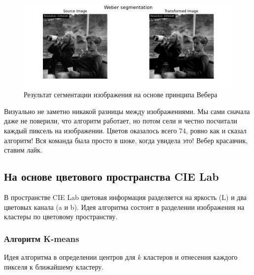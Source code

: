 \begin{figure}[ht!]
    \centering
    \includegraphics[width=\textwidth]{../results/Weber segmentation.png}
    \caption{Результат сегментации изображения на основе принципа Вебера}
    \label{img:weber_segmentation}
\end{figure}

Визуально не заметно никакой разницы между изображениями. Мы сами сначала даже не поверили, 
что алгоритм работает, но потом сели и честно посчитали каждый пиксель на изображении. 
Цветов оказалось всего 74, ровно как и сказал алгоритм! Вся команда была просто в шоке, когда увидела это! 
Вебер красавчик, ставим лайк. 

\subsection{На основе цветового пространства CIE Lab}

В пространстве CIE Lab цветовая информация разделяется на яркость (L) и два цветовых канала (a и b).
Идея алгоритма состоит в разделении изображения на кластеры по цветовому пространству.

\subsubsection{Алгоритм K-means}

Идея алгоритма в определении центров для $k$ кластеров и отнесения каждого пикселя к ближайшему кластеру.

